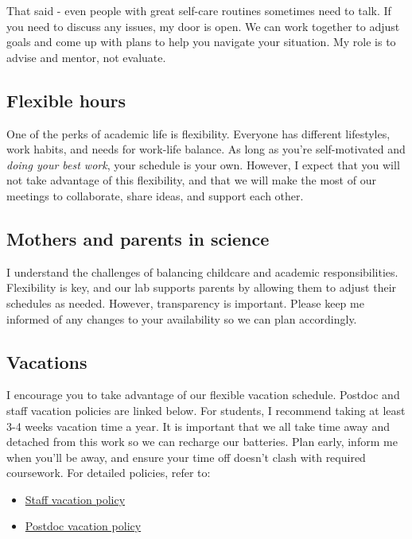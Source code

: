 \documentclass[
  letterpaper,
  DIV=11,
  numbers=noendperiod]{scrreprt}
\providecommand{\tightlist}{%
  \setlength{\itemsep}{0pt}\setlength{\parskip}{0pt}}\usepackage{longtable,booktabs,array}
\begin{document}
That said - even people with great self-care routines sometimes need to
talk. If you need to discuss any issues, my door is open. We can work
together to adjust goals and come up with plans to help you navigate
your situation. My role is to advise and mentor, not evaluate.

\subsection*{Flexible hours}\label{flexible-hours}

One of the perks of academic life is flexibility. Everyone has different
lifestyles, work habits, and needs for work-life balance. As long as
you're self-motivated and \emph{doing your best work}, your schedule is
your own. However, I expect that you will not take advantage of this
flexibility, and that we will make the most of our meetings to
collaborate, share ideas, and support each other.

\subsection*{Mothers and parents in
science}\label{mothers-and-parents-in-science}

I understand the challenges of balancing childcare and academic
responsibilities. Flexibility is key, and our lab supports parents by
allowing them to adjust their schedules as needed. However, transparency
is important. Please keep me informed of any changes to your
availability so we can plan accordingly.

\subsection*{Vacations}\label{vacations}

I encourage you to take advantage of our flexible vacation schedule.
Postdoc and staff vacation policies are linked below. For students, I
recommend taking at least 3-4 weeks vacation time a year. It is
important that we all take time away and detached from this work so we
can recharge our batteries. Plan early, inform me when you'll be away,
and ensure your time off doesn't clash with required coursework. For
detailed policies, refer to:

\begin{itemize}
\tightlist
\item
  \href{https://www.hr.pitt.edu/current-employees/benefits/time-off}{Staff
  vacation policy}\\
\item
  \href{https://www.postdoc.pitt.edu/postdoctoral-classifications-and-benefits}{Postdoc
  vacation policy}
\end{itemize}
\end{document}
